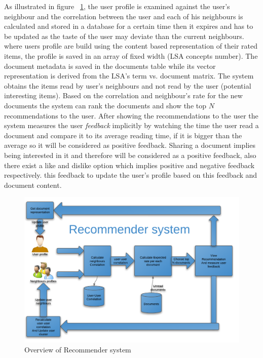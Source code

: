As illustrated in figure ~\ref{fig:reco_1}, the user profile is examined against the user's neighbour and the correlation between the user and each of his neighbours is calculated and stored in a database for a certain time then it expires and has to be updated as the taste of the user may deviate than the current neighbours. where users profile are build using the content based representation of their rated items, the profile is saved in an array of fixed width (LSA concepts number). The document metadata is saved in the documents table while its vector representation is derived from the LSA's term vs. document matrix.
The system obtains the items read by user's neighbours and not read by the user (potential interesting items). 
Based on the correlation and neighbour's rate for the new documents the system can rank the documents and show the top $N$ recommendations to the user.
After showing the recommendations to the user the system measures the user \textit{feedback} implicitly by watching the time the user read a document and compare it to its average reading time, if it is bigger than the average so it will be considered as positive feedback. Sharing a document implies being interested in it and therefore will be considered as a positive feedback, also there exist a like and dislike option which implies positive and negative feedback respectively. this feedback to update the user's profile based on this feedback and document content.
\begin{figure}[htb]
\begin{center}
\includegraphics[totalheight=1\textheight,
width=1\textwidth]{./Figures/reco_1.png}
\end{center}
\caption{Overview of Recommender system}
\label{fig:reco_1}
\end{figure}

